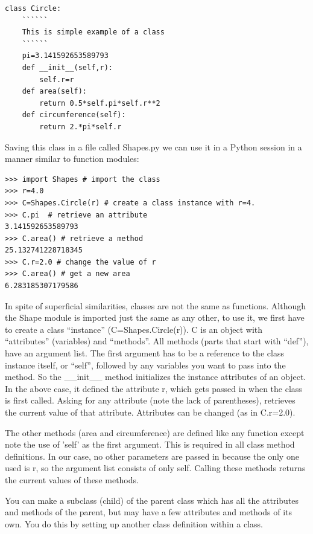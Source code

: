 \documentclass[11pt]{book}
\begin{document}
{{{ \color{blue} \begin{verbatim}
class Circle:
    ``````
    This is simple example of a class
    ``````
    pi=3.141592653589793
    def __init__(self,r):
        self.r=r
    def area(self):
        return 0.5*self.pi*self.r**2
    def circumference(self):
        return 2.*pi*self.r

\end{verbatim}}

\noindent Saving this class in a file called {\color{blue}Shapes.py} we can use it in a Python session in a manner similar to function modules:

{ \color{blue} \begin{verbatim}
>>> import Shapes # import the class
>>> r=4.0
>>> C=Shapes.Circle(r) # create a class instance with r=4.
>>> C.pi  # retrieve an attribute
3.141592653589793
>>> C.area() # retrieve a method
25.132741228718345
>>> C.r=2.0 # change the value of r
>>> C.area() # get a new area
6.283185307179586
\end{verbatim}}

\noindent In spite of superficial similarities, classes are not the same as functions.  Although the Shape module is imported just the same as any other, to use it, we first have to create a class ``instance'' ({\color{blue}C=Shapes.Circle(r)}).  {\color{blue}C} is an object with 	``attributes'' (variables) and ``methods''.
All methods (parts that start with ``def''),  have an argument list. The first argument has to be a reference to the class instance itself, or ``self'', followed by any variables you want to pass into the method.  So the {\color{blue}\_\_init\_\_} method initializes the instance attributes of an object.  In the above case, it defined the attribute {\color{blue}r}, which gets passed in when the class is first called.
Asking for any attribute (note the lack of parentheses), retrieves the current value of that attribute.  Attributes can be changed (as in  {\color{blue}C.r=2.0}).

The other methods ({\color{blue}area} and {\color{blue}circumference}) are defined like any function except note the use of 'self' as the first argument.  This is required in all class method definitions.  In our case, no other parameters are passed in because the only one used is {\color{blue}r}, so the argument list consists of only {\color{blue}self}.  Calling these methods returns the current values of these methods.

You can make a subclass (child) of the parent class which has all the attributes and methods of the parent, but may have a few attributes and methods of its own.   You do this by setting up another class definition within a class.

}}
\end{document}

